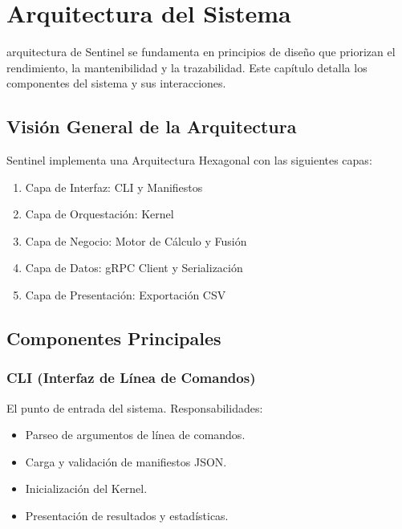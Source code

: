 \chapter{Arquitectura del Sistema}

\bigskip

 arquitectura de Sentinel se fundamenta en principios de diseño que priorizan el rendimiento, la mantenibilidad y la trazabilidad. Este capítulo detalla los componentes del sistema y sus interacciones.

\bigskip

\section{Visión General de la Arquitectura}

Sentinel implementa una Arquitectura Hexagonal con las siguientes capas:

\begin{enumerate}
    \item Capa de Interfaz: CLI y Manifiestos
    \item Capa de Orquestación: Kernel
    \item Capa de Negocio: Motor de Cálculo y Fusión
    \item Capa de Datos: gRPC Client y Serialización
    \item Capa de Presentación: Exportación CSV
\end{enumerate}

\bigskip

\section{Componentes Principales}

\subsection{CLI (Interfaz de Línea de Comandos)}

El punto de entrada del sistema. Responsabilidades:

\begin{itemize}
    \item Parseo de argumentos de línea de comandos.
    \item Carga y validación de manifiestos JSON.
    \item Inicialización del Kernel.
    \item Presentación de resultados y estadísticas.
\end{itemize}

